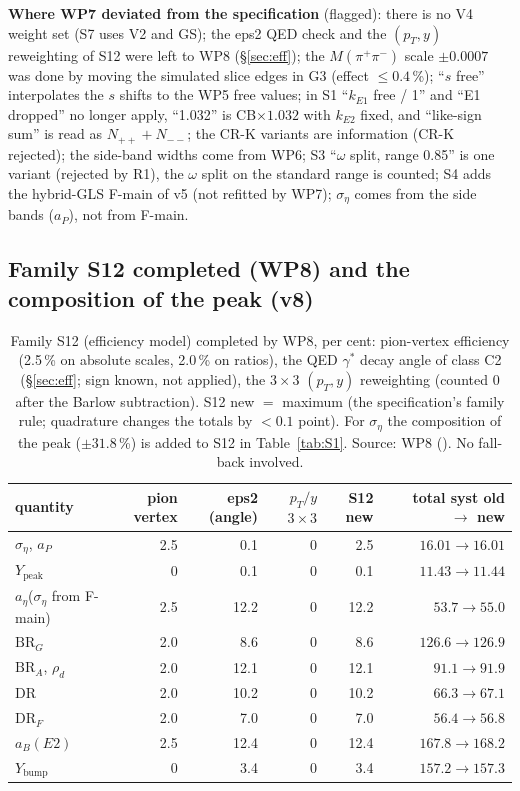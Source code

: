 \documentclass[11pt,a4paper]{article}
\newcommand{\Mpipi}{\ensuremath{M(\pi^{+}\pi^{-})}\xspace}
\newcommand{\code}[1]{\texttt{\detokenize{#1}}}
\newcommand{\aEta}{\ensuremath{a_\eta}\xspace}
\newcommand{\aP}{\ensuremath{a_P}\xspace}
\newcommand{\aB}{\ensuremath{a_B(E2)}\xspace}%
\newcommand{\Ybump}{\ensuremath{Y_{\mathrm{bump}}}\xspace}
\newcommand{\Ypeak}{\ensuremath{Y_{\mathrm{peak}}}\xspace}
\newcommand{\rhod}{\ensuremath{\rho_d}\xspace}
\newcommand{\kEone}{\ensuremath{k_{E1}}\xspace}
\newcommand{\kEtwo}{\ensuremath{k_{E2}}\xspace}
\newcommand{\BRG}{\ensuremath{\mathrm{BR}_G}\xspace}
\newcommand{\BRA}{\ensuremath{\mathrm{BR}_A}\xspace}
\begin{document}
\textbf{Where WP7 deviated from the specification} (flagged): there is no V4 weight set (S7 uses V2 and GS); the eps2 QED check and the
$(p_T,y)$ reweighting of S12 were left to WP8 (\S\ref{sec:eff}); the \Mpipi scale $\pm0.0007$ was done by moving the simulated slice edges in G3
(effect $\le0.4$\,\%); ``$s$ free'' interpolates the $s$ shifts to the WP5 free values; in S1 ``\kEone free / 1'' and ``E1 dropped'' no longer
apply, ``1.032'' is CB$\times1.032$ with \kEtwo fixed, and ``like-sign sum'' is read as $N_{++}+N_{--}$; the CR-K variants are information
(CR-K rejected); the side-band widths come from WP6; S3 ``$\omega$ split, range 0.85'' is one variant (rejected by R1), the $\omega$ split on
the standard range is counted; S4 adds the hybrid-GLS F-main of v5 (not refitted by WP7); $\sigma_\eta$ comes from the side bands (\aP), not
from F-main.

\subsection{Family S12 completed (WP8) and the composition of the peak (v8)}
\begin{table}[H]
\centering
\caption{Family S12 (efficiency model) completed by WP8, per cent: pion-vertex efficiency (2.5\,\% on absolute scales, 2.0\,\% on ratios),
the QED $\gamma^*$ decay angle of class C2 (\S\ref{sec:eff}; sign known, not applied), the $3\times3$ $(p_T,y)$ reweighting (counted 0 after the
Barlow subtraction). S12 new $=$ maximum (the specification's family rule; quadrature changes the totals by $<0.1$ point). For
$\sigma_\eta$ the composition of the peak ($\pm31.8$\,\%) is added to S12 in Table~\ref{tab:S1}. Source: WP8 (\code{wp8_S12.txt}). No fall-back involved.}
\label{tab:S12}
\small
\begin{tabular}{@{}l r r r r r@{}}
\toprule
quantity & pion vertex & eps2 (angle) & $p_T/y$ $3\times3$ & S12 new & total syst old $\to$ new \\
\midrule
$\sigma_\eta$, \aP & 2.5 & 0.1 & 0 & 2.5 & $16.01\to16.01$ \\
\Ypeak & 0 & 0.1 & 0 & 0.1 & $11.43\to11.44$ \\
\aEta ($\sigma_\eta$ from F-main) & 2.5 & 12.2 & 0 & 12.2 & $53.7\to55.0$ \\
\BRG & 2.0 & 8.6 & 0 & 8.6 & $126.6\to126.9$ \\
\BRA, \rhod & 2.0 & 12.1 & 0 & 12.1 & $91.1\to91.9$ \\
DR & 2.0 & 10.2 & 0 & 10.2 & $66.3\to67.1$ \\
DR$_F$ & 2.0 & 7.0 & 0 & 7.0 & $56.4\to56.8$ \\
\aB & 2.5 & 12.4 & 0 & 12.4 & $167.8\to168.2$ \\
\Ybump & 0 & 3.4 & 0 & 3.4 & $157.2\to157.3$ \\
\bottomrule
\end{tabular}
\end{table}
\end{document}

